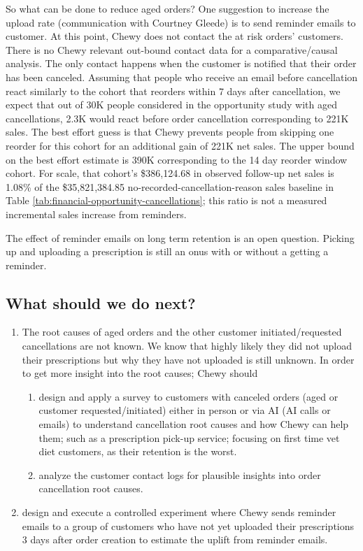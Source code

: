 \documentclass[
  10pt,
]{article}
\begin{document}
So what can be done to reduce aged orders?  One suggestion to increase
the upload rate (communication with Courtney Gleede) is to send
reminder emails to customer. At this point, Chewy does not contact the
at risk orders' customers. There is no Chewy relevant out-bound
contact data for a comparative/causal analysis. The only contact
happens when the customer is notified that their order has been
canceled.  Assuming that people who receive an email before
cancellation react similarly to the cohort that reorders within 7 days
after cancellation, we expect that out of 30K people considered in the
opportunity study with aged cancellations, 2.3K would react before
order cancellation corresponding to 221K sales. The best effort guess
is that Chewy prevents people from skipping one reorder for this
cohort for an additional gain of 221K net sales.  The upper bound on
the best effort estimate is 390K corresponding to the 14 day reorder
window cohort. For scale, that cohort's \$386,124.68 in observed
follow-up net sales is 1.08\% of the \$35,821,384.85 no-recorded-cancellation-reason
sales baseline in Table \ref{tab:financial-opportunity-cancellations};
this ratio is not a measured incremental sales increase from reminders.

The effect of reminder emails on long term retention is an open
question. Picking up and uploading a prescription is
still an onus with or without a getting a reminder.

\subsection{What should we do next?}
\begin{enumerate}
\item The root causes of aged orders and the other customer
  initiated/requested cancellations are not known. We know that highly
  likely they did not upload their prescriptions but why they have not
  uploaded is still unknown. In order to get more insight into the
  root causes; Chewy should
\begin{enumerate}
\item design and apply a survey to customers with canceled orders
  (aged or customer requested/initiated) either in person or via AI
  (AI calls or emails) to understand cancellation root causes and how
  Chewy can help them; such as a prescription pick-up service;
  focusing on first time vet diet customers, as their retention is the
  worst.
\item analyze the customer contact logs for plausible insights into
  order cancellation root causes.
\end{enumerate}
\item design and execute a controlled experiment where Chewy sends
  reminder emails to a group of customers who have not yet uploaded their
  prescriptions 3 days after order creation to estimate the uplift
  from reminder emails.
\end{enumerate}
\end{document}
